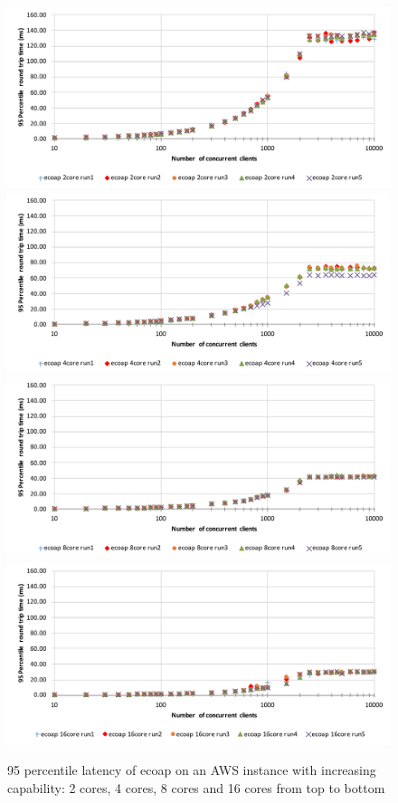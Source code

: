\begin{figure}[!htbp]
\centering
\includegraphics[scale=0.6]{ecoap_95p_latency_2cores}
\includegraphics[scale=0.6]{ecoap_95p_latency_4cores}
\includegraphics[scale=0.6]{ecoap_95p_latency_8cores}
\includegraphics[scale=0.6]{ecoap_95p_latency_16cores}
\caption[95 percentile latency of ecoap on an AWS instance with increasing capability]{95 percentile latency of ecoap on an AWS instance with increasing capability: 2 cores, 4 cores, 8 cores and 16 cores from top to bottom}
\label{fig:ecoap_95p_latency}
\end{figure}

